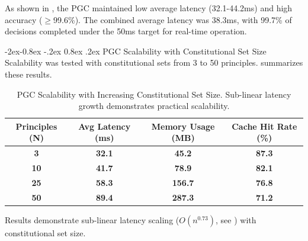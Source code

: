 \documentclass[manuscript,screen,review,anonymous,9pt]{acmart}
\makeatletter
\renewcommand\subsubsection{\@startsection{subsubsection}{3}{\z@}%
  {-2ex\@plus -0.8ex \@minus -.2ex}%
  {0.8ex \@plus .2ex}%
  {\normalfont\normalsize\bfseries}}
\newcommand{\tablesize}{\footnotesize}
\newcommand{\tablenumfmt}[1]{\textbf{#1}}
\newcommand{\tableheader}[1]{\textbf{#1}}
\makeatother
\begin{document}
As shown in , the PGC maintained low average latency (32.1-44.2ms) and high accuracy ($\geq$99.6\%). The combined average latency was 38.3ms, with 99.7\% of decisions completed under the 50ms target for real-time operation.

\subsubsection{PGC Scalability with Constitutional Set Size}
Scalability was tested with constitutional sets from 3 to 50 principles.  summarizes these results.
\begin{table}[htbp]
\centering
\caption{PGC Scalability with Increasing Constitutional Set Size. Sub-linear latency growth demonstrates practical scalability.}
\label{tab:pgc_scalability}
\tablesize
\begin{tabular}{@{}cccc@{}}
\toprule
\tableheader{Principles (N)} & \tableheader{Avg Latency (ms)} & \tableheader{Memory Usage (MB)} & \tableheader{Cache Hit Rate (\%)} \\
\midrule
\tablenumfmt{3}   & \tablenumfmt{32.1}  & \tablenumfmt{45.2}  & \tablenumfmt{87.3} \\
\tablenumfmt{10}  & \tablenumfmt{41.7}  & \tablenumfmt{78.9}  & \tablenumfmt{82.1} \\
\tablenumfmt{25}  & \tablenumfmt{58.3}  & \tablenumfmt{156.7} & \tablenumfmt{76.8} \\
\tablenumfmt{50}  & \tablenumfmt{89.4}  & \tablenumfmt{287.3} & \tablenumfmt{71.2} \\
\bottomrule
\end{tabular}
\end{table}
Results demonstrate sub-linear latency scaling ($O(n^{0.73})$, see ) with constitutional set size.
\end{document}
